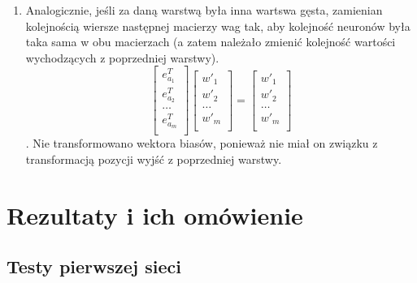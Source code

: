 \documentclass[12pt]{article}
\begin{document}
\begin{enumerate}
\begin{enumerate}
		\item Analogicznie, jeśli za daną warstwą była inna wartswa gęsta, zamienian kolejnością wiersze następnej macierzy wag tak, aby kolejność neuronów była taka sama w obu macierzach (a zatem należało zmienić kolejność wartości wychodzących z poprzedniej warstwy).
		$$\begin{bmatrix}
			e_{a_1}^T\\ e_{a_2}^T\\ \dots\\ e_{a_m}^T\\
		\end{bmatrix}
		\begin{bmatrix}
			w'_1\\ w'_2\\ \dots\\ w'_m\\
		\end{bmatrix}
		=
		\begin{bmatrix}
			w'_1\\ w'_2\\ \dots\\ w'_m\\
		\end{bmatrix}
		$$. Nie transformowano wektora biasów, ponieważ nie miał on związku z transformacją pozycji wyjść z poprzedniej warstwy.
	\end{enumerate}
\end{enumerate}
\section{Rezultaty i ich omówienie}
\subsection{Testy pierwszej sieci}
\end{document}
